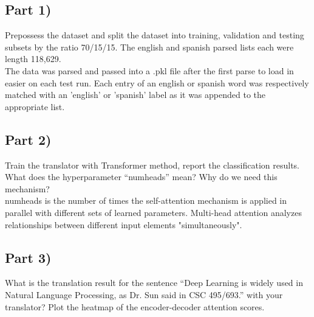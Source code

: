 \documentclass[conference]{IEEEtran}
\begin{document}
\subsection{Part 1)}
\par \noindent Prepossess the dataset and split the dataset into training, validation and testing subsets by the ratio 70/15/15. The english and spanish parsed lists each were length 118,629.\\

The data was parsed and passed into a .pkl file after the first parse to load in easier on each test run. Each entry of an english or spanish word was respectively matched with an 'english' or 'spanish' label as it was appended to the appropriate list.

\subsection{Part 2)}
\par \noindent Train the translator with Transformer method, report the classification results. What does the hyperparameter “num\textunderscore heads” mean? Why do we need this mechanism?\\

num\textunderscore heads is the number of times the self-attention mechanism is applied in parallel with different sets of learned parameters. Multi-head attention analyzes relationships between different input elements "simultaneously".

\subsection{Part 3)}
\par \noindent What is the translation result for the sentence “Deep Learning is widely used in Natural Language Processing, as Dr. Sun said in CSC 495/693.” with your translator? Plot the heatmap of the encoder-decoder attention scores.
\end{document}
